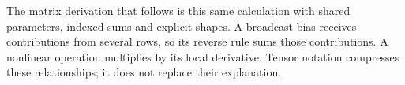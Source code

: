 The matrix derivation that follows is this same calculation with shared
parameters, indexed sums and explicit shapes. A broadcast bias receives
contributions from several rows, so its reverse rule sums those contributions.
A nonlinear operation multiplies by its local derivative. Tensor notation
compresses these relationships; it does not replace their explanation.
